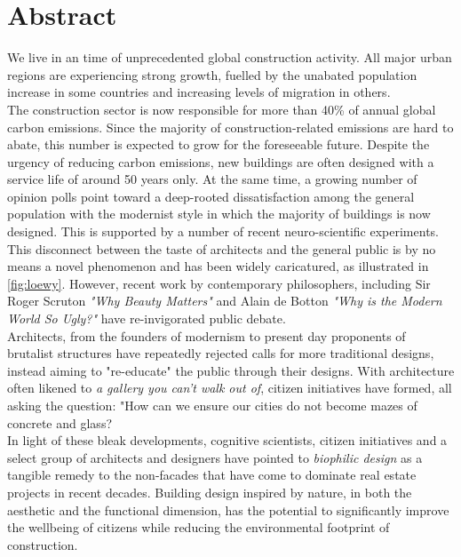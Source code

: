 \documentclass{article}
\begin{document}
\section{Abstract}
\label{sec:abstract}

\begin{minipage}{0.625\textwidth}

We live in an time of unprecedented global construction activity. All major urban regions are experiencing strong growth, fuelled by the unabated population increase in some countries and increasing levels of migration in others. \\

The construction sector is now responsible for more than 40\% of annual global carbon emissions. Since the majority of construction-related emissions are hard to abate, this number is expected to grow for the foreseeable future. Despite the urgency of reducing carbon emissions, new buildings are often designed with a service life of around 50 years only. At the same time, a growing number of opinion polls point toward a deep-rooted dissatisfaction among the general population with the modernist style in which the majority of buildings is now designed. This is supported by a number of recent neuro-scientific experiments. \\

This disconnect between the taste of architects and the general public is by no means a novel phenomenon and has been widely caricatured, as illustrated in \cref{fig:loewy}. However, recent work by contemporary philosophers, including Sir Roger Scruton \textit{"Why Beauty Matters"} and Alain de Botton \textit{"Why is the Modern World So Ugly?"} have re-invigorated public debate. \\

Architects, from the founders of modernism to present day proponents of brutalist structures have repeatedly rejected calls for more traditional designs, instead aiming to "re-educate" the public through their designs. With architecture often likened to \textit{a gallery you can't walk out of}, citizen initiatives have formed, all asking the question: "How can we ensure our cities do not become mazes of concrete and glass? \\

In light of these bleak developments, cognitive scientists, citizen initiatives and a select group of architects and designers have pointed to \textit{biophilic design} as a tangible remedy to the non-facades that have come to dominate real estate projects in recent decades. Building design inspired by nature, in both the aesthetic and the functional dimension, has the potential to significantly improve the wellbeing of citizens while reducing the environmental footprint of construction. \\


\end{minipage}
\end{document}
